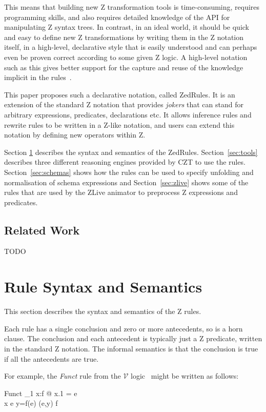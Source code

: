 \documentclass{entcs}
\newcommand{\V}{\mathcal{V}}
\begin{document}
This means that building new Z transformation tools is time-consuming,
requires programming skills, and also requires detailed knowledge of the
API for manipulating Z syntax trees.  In contrast, in an ideal world, it
should be quick and easy to define new Z transformations by writing them in
the Z notation itself, in a high-level, declarative style that is easily
understood and can perhaps even be proven correct according to some given Z
logic.  A high-level notation such as this gives better support for the
capture and reuse of the knowledge implicit in the
rules~\cite{armour:business-model00}.

This paper proposes such a declarative notation, called ZedRules.  It
is an extension of the standard Z notation that provides \emph{jokers}
that can stand for arbitrary expressions, predicates, declarations
etc.  It allows inference rules and rewrite rules to be written in a
Z-like notation, and users can extend this notation by defining new
operators within Z.

Section \ref{sec:syntax} describes the syntax and semantics of the
ZedRules.  Section~\ref{sec:tools} describes three different reasoning
engines provided by CZT to use the rules.  Section~\ref{sec:schemas} shows
how the rules can be used to specify unfolding and normalisation of schema
expressions and Section~\ref{sec:zlive} shows some of the rules that are
used by the ZLive animator to preprocess Z expressions and predicates.



\subsection{Related Work} \label{sec:relwork}

TODO


\section{Rule Syntax and Semantics} \label{sec:syntax}

This section describes the syntax and semantics of the Z rules.

Each rule has a single conclusion and zero or more antecedents, so is a
horn clause.  The conclusion and each antecedent is typically just a Z
predicate, written in the standard Z notation.  The informal semantics
is that the conclusion is true if all the antecedents are true.

For example, the \emph{Funct} rule from the $\V$
logic~\cite{brien:calculus-schemas-z00} might be written as follows:
\begin{zedrule}{Funct}
  \exists_1 x:f @ x.1 = e \\
  x \notfreein e
\derives
  y=f(e) \iff (e,y) \in f
\end{zedrule}
\end{document}
